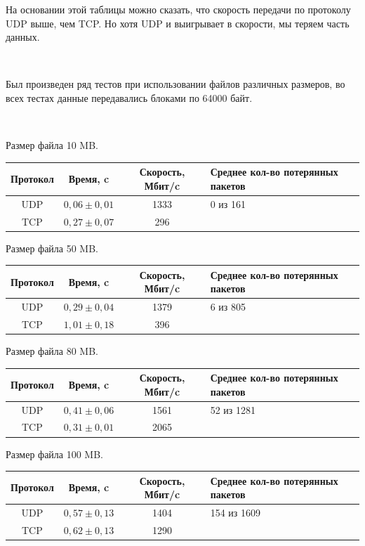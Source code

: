 \documentclass{article}
\begin{document}
На основании этой таблицы можно сказать, что скорость передачи по протоколу UDP выше, чем TCP. Но хотя UDP и выигрывает в скорости, мы теряем часть данных.

~\

Был произведен ряд тестов при использовании файлов различных размеров, во всех тестах данные передавались блоками по 64000 байт.

~\

Размер файла 10 MB.

\begin{table}[h!]
\begin{tabular}{|c|c|c|p{130pt}|}
\hline
Протокол & Время, c & Скорость, Мбит/c & Среднее кол-во потерянных пакетов \\
\hline
UDP & $0,06 \pm 0,01$ & 1333 & 0 из 161\\
TCP & $0,27 \pm 0,07$ & 296 &  \\
\hline
\end{tabular}
\end{table}

\newpage

Размер файла 50 MB.

\begin{table}[h!]
\begin{tabular}{|c|c|c|p{130pt}|}
\hline
Протокол & Время, c & Скорость, Мбит/c & Среднее кол-во потерянных пакетов \\
\hline
UDP & $0,29 \pm 0,04$ & 1379 & 6 из 805\\
TCP & $1,01 \pm 0,18$ & 396 &  \\
\hline
\end{tabular}
\end{table}

Размер файла 80 MB.

\begin{table}[h!]
\begin{tabular}{|c|c|c|p{130pt}|}
\hline
Протокол & Время, c & Скорость, Мбит/c & Среднее кол-во потерянных пакетов \\
\hline
UDP & $0,41 \pm 0,06$ & 1561 & 52 из 1281\\
TCP & $0,31 \pm 0,01$ & 2065 &  \\
\hline
\end{tabular}
\end{table}

Размер файла 100 MB.

\begin{table}[h!]
\begin{tabular}{|c|c|c|p{130pt}|}
\hline
Протокол & Время, c & Скорость, Мбит/c & Среднее кол-во потерянных пакетов \\
\hline
UDP & $0,57 \pm 0,13$ & 1404 & 154 из 1609\\
TCP & $0,62 \pm 0,13$ & 1290 &  \\
\hline
\end{tabular}
\end{table}
\end{document}
